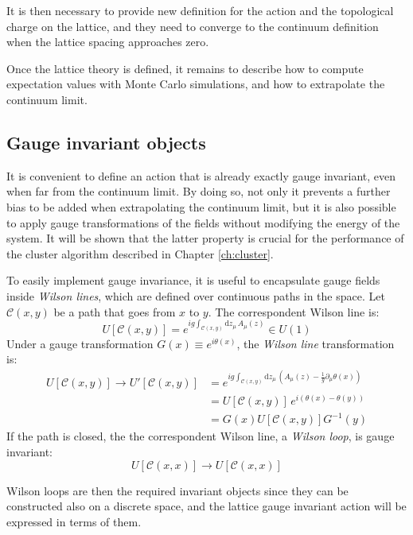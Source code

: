 It is then necessary to provide new definition for the action and the topological charge on the lattice,
and they need to converge to the continuum definition when the lattice spacing approaches zero.

Once the lattice theory is defined, it remains to describe how to compute expectation values with Monte Carlo simulations, and how to extrapolate the continuum limit.

\subsection*{Gauge invariant objects}

It is convenient to define an action that is already exactly gauge invariant, even when far from the continuum limit.
By doing so, not only it prevents a further bias to be added when extrapolating the continuum limit,
but it is also possible to apply gauge transformations of the fields without modifying the energy of the system.
It will be shown that the latter property is crucial for the performance of the cluster algorithm described in Chapter \ref{ch:cluster}.

To easily implement gauge invariance, it is useful to encapsulate gauge fields inside \emph{Wilson lines}, which are defined over continuous paths in the space.
Let $\mathcal C(x,y)$ be a path that goes from $x$ to $y$. The correspondent Wilson line is:
\[
    U[\mathcal C(x,y)] = e^{ig\int_{\mathcal C(x,y)}\mathrm dz_\mu\,A_\mu(z)} \in U(1)
\]
Under a gauge transformation $G(x) \equiv e^{i\theta(x)}$, the \emph{Wilson line} transformation is:
\begin{equation}\label{eq:path_gauge}
    \begin{aligned}
    U[\mathcal C(x,y)] \rightarrow U'[\mathcal C(x,y)] &= e^{ig\int_{\mathcal C(x,y)}\mathrm dz_\mu\,\left(A_\mu(z) - \frac{1}{g}\partial_\mu\theta(x)\right)} \\
                                                       &= U[\mathcal C(x,y)]\,e^{i(\theta(x) - \theta(y))} \\
                                                       &= G(x)U[\mathcal C(x,y)]G^{-1}(y)
    \end{aligned}
\end{equation}
If the path is closed, the the correspondent Wilson line, \ie a \emph{Wilson loop}, is gauge invariant:
\[
    U[\mathcal C(x,x)] \rightarrow U[\mathcal C(x,x)]
\]

Wilson loops are then the required invariant objects since they can be constructed also on a discrete space,
and the lattice gauge invariant action will be expressed in terms of them.

